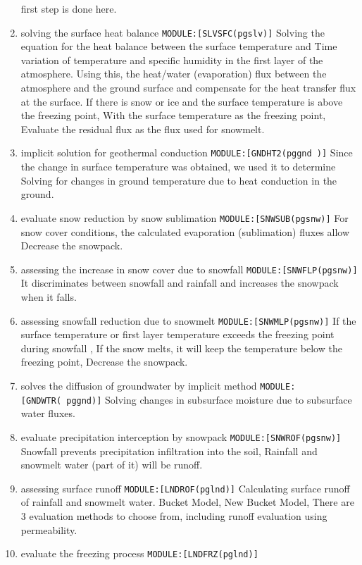 \begin{enumerate}
  first step is done here.
\item
  solving the surface heat balance \texttt{MODULE:{[}SLVSFC(pgslv){]}}
  Solving the equation for the heat balance between the surface
  temperature and Time variation of temperature and specific humidity in
  the first layer of the atmosphere. Using this, the heat/water
  (evaporation) flux between the atmosphere and the ground surface and
  compensate for the heat transfer flux at the surface. If there is snow
  or ice and the surface temperature is above the freezing point, With
  the surface temperature as the freezing point, Evaluate the residual
  flux as the flux used for snowmelt.
\item
  implicit solution for geothermal conduction
  \texttt{MODULE:{[}GNDHT2(pggnd\ ){]}} Since the change in surface
  temperature was obtained, we used it to determine Solving for changes
  in ground temperature due to heat conduction in the ground.
\item
  evaluate snow reduction by snow sublimation
  \texttt{MODULE:{[}SNWSUB(pgsnw){]}} For snow cover conditions, the
  calculated evaporation (sublimation) fluxes allow Decrease the
  snowpack.
\item
  assessing the increase in snow cover due to snowfall
  \texttt{MODULE:{[}SNWFLP(pgsnw){]}} It discriminates between snowfall
  and rainfall and increases the snowpack when it falls.
\item
  assessing snowfall reduction due to snowmelt
  \texttt{MODULE:{[}SNWMLP(pgsnw){]}} If the surface temperature or
  first layer temperature exceeds the freezing point during snowfall ,
  If the snow melts, it will keep the temperature below the freezing
  point, Decrease the snowpack.
\item
  solves the diffusion of groundwater by implicit method
  \texttt{MODULE:{[}GNDWTR(\ pggnd){]}} Solving changes in subsurface
  moisture due to subsurface water fluxes.
\item
  evaluate precipitation interception by snowpack
  \texttt{MODULE:{[}SNWROF(pgsnw){]}} Snowfall prevents precipitation
  infiltration into the soil, Rainfall and snowmelt water (part of it)
  will be runoff.
\item
  assessing surface runoff \texttt{MODULE:{[}LNDROF(pglnd){]}}
  Calculating surface runoff of rainfall and snowmelt water. Bucket
  Model, New Bucket Model, There are 3 evaluation methods to choose
  from, including runoff evaluation using permeability.
\item
  evaluate the freezing process \texttt{MODULE:{[}LNDFRZ(pglnd){]}}

\end{enumerate}
